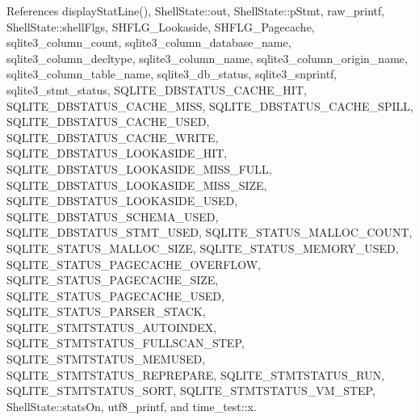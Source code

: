 References display\+Stat\+Line(), Shell\+State\+::out, Shell\+State\+::p\+Stmt, raw\+\_\+printf, Shell\+State\+::shell\+Flgs, S\+H\+F\+L\+G\+\_\+\+Lookaside, S\+H\+F\+L\+G\+\_\+\+Pagecache, sqlite3\+\_\+column\+\_\+count, sqlite3\+\_\+column\+\_\+database\+\_\+name, sqlite3\+\_\+column\+\_\+decltype, sqlite3\+\_\+column\+\_\+name, sqlite3\+\_\+column\+\_\+origin\+\_\+name, sqlite3\+\_\+column\+\_\+table\+\_\+name, sqlite3\+\_\+db\+\_\+status, sqlite3\+\_\+snprintf, sqlite3\+\_\+stmt\+\_\+status, S\+Q\+L\+I\+T\+E\+\_\+\+D\+B\+S\+T\+A\+T\+U\+S\+\_\+\+C\+A\+C\+H\+E\+\_\+\+H\+IT, S\+Q\+L\+I\+T\+E\+\_\+\+D\+B\+S\+T\+A\+T\+U\+S\+\_\+\+C\+A\+C\+H\+E\+\_\+\+M\+I\+SS, S\+Q\+L\+I\+T\+E\+\_\+\+D\+B\+S\+T\+A\+T\+U\+S\+\_\+\+C\+A\+C\+H\+E\+\_\+\+S\+P\+I\+LL, S\+Q\+L\+I\+T\+E\+\_\+\+D\+B\+S\+T\+A\+T\+U\+S\+\_\+\+C\+A\+C\+H\+E\+\_\+\+U\+S\+ED, S\+Q\+L\+I\+T\+E\+\_\+\+D\+B\+S\+T\+A\+T\+U\+S\+\_\+\+C\+A\+C\+H\+E\+\_\+\+W\+R\+I\+TE, S\+Q\+L\+I\+T\+E\+\_\+\+D\+B\+S\+T\+A\+T\+U\+S\+\_\+\+L\+O\+O\+K\+A\+S\+I\+D\+E\+\_\+\+H\+IT, S\+Q\+L\+I\+T\+E\+\_\+\+D\+B\+S\+T\+A\+T\+U\+S\+\_\+\+L\+O\+O\+K\+A\+S\+I\+D\+E\+\_\+\+M\+I\+S\+S\+\_\+\+F\+U\+LL, S\+Q\+L\+I\+T\+E\+\_\+\+D\+B\+S\+T\+A\+T\+U\+S\+\_\+\+L\+O\+O\+K\+A\+S\+I\+D\+E\+\_\+\+M\+I\+S\+S\+\_\+\+S\+I\+ZE, S\+Q\+L\+I\+T\+E\+\_\+\+D\+B\+S\+T\+A\+T\+U\+S\+\_\+\+L\+O\+O\+K\+A\+S\+I\+D\+E\+\_\+\+U\+S\+ED, S\+Q\+L\+I\+T\+E\+\_\+\+D\+B\+S\+T\+A\+T\+U\+S\+\_\+\+S\+C\+H\+E\+M\+A\+\_\+\+U\+S\+ED, S\+Q\+L\+I\+T\+E\+\_\+\+D\+B\+S\+T\+A\+T\+U\+S\+\_\+\+S\+T\+M\+T\+\_\+\+U\+S\+ED, S\+Q\+L\+I\+T\+E\+\_\+\+S\+T\+A\+T\+U\+S\+\_\+\+M\+A\+L\+L\+O\+C\+\_\+\+C\+O\+U\+NT, S\+Q\+L\+I\+T\+E\+\_\+\+S\+T\+A\+T\+U\+S\+\_\+\+M\+A\+L\+L\+O\+C\+\_\+\+S\+I\+ZE, S\+Q\+L\+I\+T\+E\+\_\+\+S\+T\+A\+T\+U\+S\+\_\+\+M\+E\+M\+O\+R\+Y\+\_\+\+U\+S\+ED, S\+Q\+L\+I\+T\+E\+\_\+\+S\+T\+A\+T\+U\+S\+\_\+\+P\+A\+G\+E\+C\+A\+C\+H\+E\+\_\+\+O\+V\+E\+R\+F\+L\+OW, S\+Q\+L\+I\+T\+E\+\_\+\+S\+T\+A\+T\+U\+S\+\_\+\+P\+A\+G\+E\+C\+A\+C\+H\+E\+\_\+\+S\+I\+ZE, S\+Q\+L\+I\+T\+E\+\_\+\+S\+T\+A\+T\+U\+S\+\_\+\+P\+A\+G\+E\+C\+A\+C\+H\+E\+\_\+\+U\+S\+ED, S\+Q\+L\+I\+T\+E\+\_\+\+S\+T\+A\+T\+U\+S\+\_\+\+P\+A\+R\+S\+E\+R\+\_\+\+S\+T\+A\+CK, S\+Q\+L\+I\+T\+E\+\_\+\+S\+T\+M\+T\+S\+T\+A\+T\+U\+S\+\_\+\+A\+U\+T\+O\+I\+N\+D\+EX, S\+Q\+L\+I\+T\+E\+\_\+\+S\+T\+M\+T\+S\+T\+A\+T\+U\+S\+\_\+\+F\+U\+L\+L\+S\+C\+A\+N\+\_\+\+S\+T\+EP, S\+Q\+L\+I\+T\+E\+\_\+\+S\+T\+M\+T\+S\+T\+A\+T\+U\+S\+\_\+\+M\+E\+M\+U\+S\+ED, S\+Q\+L\+I\+T\+E\+\_\+\+S\+T\+M\+T\+S\+T\+A\+T\+U\+S\+\_\+\+R\+E\+P\+R\+E\+P\+A\+RE, S\+Q\+L\+I\+T\+E\+\_\+\+S\+T\+M\+T\+S\+T\+A\+T\+U\+S\+\_\+\+R\+UN, S\+Q\+L\+I\+T\+E\+\_\+\+S\+T\+M\+T\+S\+T\+A\+T\+U\+S\+\_\+\+S\+O\+RT, S\+Q\+L\+I\+T\+E\+\_\+\+S\+T\+M\+T\+S\+T\+A\+T\+U\+S\+\_\+\+V\+M\+\_\+\+S\+T\+EP, Shell\+State\+::stats\+On, utf8\+\_\+printf, and time\+\_\+test\+::x.



